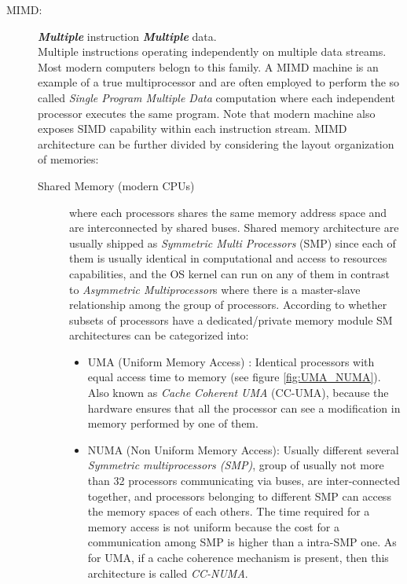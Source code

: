 \begin{description}
\item[MIMD:] \textit{\textbf{Multiple}} instruction \textit{\textbf{Multiple}} data. \hfill \\
Multiple instructions operating independently on multiple data streams.
Most modern computers belogn to this family. A MIMD machine is an example of a true multiprocessor and are often employed to perform the so called \textit{Single Program Multiple Data} computation where each independent processor executes the same program.
Note that modern machine also exposes SIMD capability within each instruction stream.
MIMD architecture can be further divided by considering the  layout organization of memories:
\begin{description}
	\item [Shared Memory (modern CPUs)] where each processors shares the same memory address space and are interconnected by shared buses. 
	Shared memory architecture are usually shipped as \textit{Symmetric Multi Processors} (SMP) since each of them is usually identical in computational and access to resources capabilities, and the OS kernel can run on any of them in contrast to \textit{Asymmetric Multiprocessor}s where there is a master-slave relationship  among the group of processors.
	According to whether subsets of processors have a dedicated/private memory module SM architectures can be categorized into:	
	\begin{itemize}
		\item UMA (Uniform Memory Access) : Identical processors with equal
		access time to memory (see figure \ref{fig:UMA_NUMA}).
		Also known as \textit{Cache Coherent UMA} (CC-UMA), because the
		hardware ensures that all the processor can see a modification in memory performed by one of them.
		\item NUMA (Non Uniform Memory Access): Usually different several\textit{ Symmetric multiprocessors (SMP)}, group of usually not more than 32 processors communicating via buses, are inter-connected together, and processors belonging to different SMP can access the memory spaces of each others. The time required for a memory access is not uniform  because the cost for a communication among SMP is higher than a intra-SMP one.
		 As for UMA, if a cache coherence mechanism  is present, then this architecture is called \textit{CC-NUMA}.
		 \begin{figure}[b]
			\caption[Shared memory architectures.]{UMA and NUMA shared memory architecture.}
			\label{fig:UMA_NUMA}
			\centering
			\begin{subfigure}[b]{0.5\textwidth}

\end{subfigure}
\end{figure}
\end{itemize}
\end{description}
\end{description}
